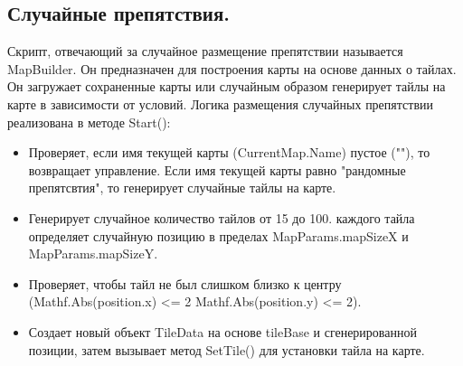 \subsection{Случайные препятствия.}
Скрипт, отвечающий за случайное размещение препятствии называется MapBuilder. Он предназначен для построения карты на основе данных о тайлах. Он загружает сохраненные карты или случайным образом генерирует тайлы на карте в зависимости от условий.
Логика размещения случайных препятствии реализована в методе Start():
\begin{itemize}
    \item Проверяет, если имя текущей карты (CurrentMap.Name) пустое (""), то возвращает управление. Если имя текущей карты равно "рандомные препятсвтия", то генерирует случайные тайлы на карте.
    \item Генерирует случайное количество тайлов от 15 до 100.
     каждого тайла определяет случайную позицию в пределах MapParams.mapSizeX и MapParams.mapSizeY.
    \item Проверяет, чтобы тайл не был слишком близко к центру (Mathf.Abs(position.x) <= 2 Mathf.Abs(position.y) <= 2).
    \item Создает новый объект TileData на основе tileBase и сгенерированной позиции, затем вызывает метод SetTile() для установки тайла на карте.
\end{itemize}

